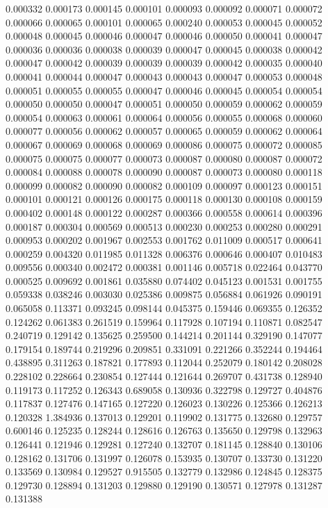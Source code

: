 0.000332
0.000173
0.000145
0.000101
0.000093
0.000092
0.000071
0.000072
0.000066
0.000065
0.000101
0.000065
0.000240
0.000053
0.000045
0.000052
0.000048
0.000045
0.000046
0.000047
0.000046
0.000050
0.000041
0.000047
0.000036
0.000036
0.000038
0.000039
0.000047
0.000045
0.000038
0.000042
0.000047
0.000042
0.000039
0.000039
0.000039
0.000042
0.000035
0.000040
0.000041
0.000044
0.000047
0.000043
0.000043
0.000047
0.000053
0.000048
0.000051
0.000055
0.000055
0.000047
0.000046
0.000045
0.000054
0.000054
0.000050
0.000050
0.000047
0.000051
0.000050
0.000059
0.000062
0.000059
0.000054
0.000063
0.000061
0.000064
0.000056
0.000055
0.000068
0.000060
0.000077
0.000056
0.000062
0.000057
0.000065
0.000059
0.000062
0.000064
0.000067
0.000069
0.000068
0.000069
0.000086
0.000075
0.000072
0.000085
0.000075
0.000075
0.000077
0.000073
0.000087
0.000080
0.000087
0.000072
0.000084
0.000088
0.000078
0.000090
0.000087
0.000073
0.000080
0.000118
0.000099
0.000082
0.000090
0.000082
0.000109
0.000097
0.000123
0.000151
0.000101
0.000121
0.000126
0.000175
0.000118
0.000130
0.000108
0.000159
0.000402
0.000148
0.000122
0.000287
0.000366
0.000558
0.000614
0.000396
0.000187
0.000304
0.000569
0.000513
0.000230
0.000253
0.000280
0.000291
0.000953
0.000202
0.001967
0.002553
0.001762
0.011009
0.000517
0.000641
0.000259
0.004320
0.011985
0.011328
0.006376
0.000646
0.000407
0.010483
0.009556
0.000340
0.002472
0.000381
0.001146
0.005718
0.022464
0.043770
0.000525
0.009692
0.001861
0.035880
0.074402
0.045123
0.001531
0.001755
0.059338
0.038246
0.003030
0.025386
0.009875
0.056884
0.061926
0.090191
0.065058
0.113371
0.093245
0.098144
0.045375
0.159446
0.069355
0.126352
0.124262
0.061383
0.261519
0.159964
0.117928
0.107194
0.110871
0.082547
0.240719
0.129142
0.135625
0.259500
0.144214
0.201144
0.329190
0.147077
0.179154
0.189744
0.219296
0.209851
0.331091
0.221266
0.352244
0.194464
0.438895
0.311263
0.187821
0.177893
0.112044
0.252079
0.180142
0.208028
0.228102
0.228664
0.230854
0.127444
0.121644
0.269707
0.431738
0.128940
0.119173
0.117252
0.126343
0.689058
0.130936
0.322798
0.129727
0.404876
0.117837
0.127476
0.147165
0.127220
0.126023
0.130226
0.125366
0.126213
0.120328
1.384936
0.137013
0.129201
0.119902
0.131775
0.132680
0.129757
0.600146
0.125235
0.128244
0.128616
0.126763
0.135650
0.129798
0.132963
0.126441
0.121946
0.129281
0.127240
0.132707
0.181145
0.128840
0.130106
0.128162
0.131706
0.131997
0.126078
0.153935
0.130707
0.133730
0.131220
0.133569
0.130984
0.129527
0.915505
0.132779
0.132986
0.124845
0.128375
0.129730
0.128894
0.131203
0.129880
0.129190
0.130571
0.127978
0.131287
0.131388
